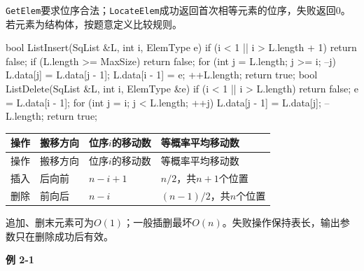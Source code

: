 \texttt{GetElem}要求位序合法；\texttt{LocateElem}成功返回首次相等元素的位序，失败返回0。若元素为结构体，按题意定义比较规则。

\par\smallskip\noindent\begin{minipage}{\linewidth}
\begin{codeblock}[language={C++}]
bool ListInsert(SqList &L, int i, ElemType e) {
    if (i < 1 || i > L.length + 1) return false;
    if (L.length >= MaxSize) return false;
    for (int j = L.length; j >= i; --j)
        L.data[j] = L.data[j - 1];
    L.data[i - 1] = e;
    ++L.length;
    return true;
}
bool ListDelete(SqList &L, int i, ElemType &e) {
    if (i < 1 || i > L.length) return false;
    e = L.data[i - 1];
    for (int j = i; j < L.length; ++j)
        L.data[j - 1] = L.data[j];
    --L.length;
    return true;
}
\end{codeblock}
\end{minipage}\par\smallskip

\par\smallskip
{\fontsize{9.3}{12}\selectfont\setlength{\tabcolsep}{2.5pt}\setlength{\LTleft}{0pt}\setlength{\LTright}{0pt}
\begin{longtable}{@{}>{\raggedright\arraybackslash}p{}>{\raggedright\arraybackslash}p{}>{\raggedright\arraybackslash}p{}>{\raggedright\arraybackslash}p{}@{}}
\toprule
操作 & 搬移方向 & 位序\(i\)的移动数 & 等概率平均移动数 \\

\midrule\endfirsthead\toprule
操作 & 搬移方向 & 位序\(i\)的移动数 & 等概率平均移动数 \\

\midrule\endhead\bottomrule\endfoot
插入 & 后向前 & \(n-i+1\) & \(n/2\)，共\(n+1\)个位置 \\

删除 & 前向后 & \(n-i\) & \((n-1)/2\)，共\(n\)个位置 \\

\end{longtable}}
\par\smallskip

追加、删末元素可为\(O(1)\)；一般插删最坏\(O(n)\)。失败操作保持表长，输出参数只在删除成功后有效。

\par\medskip{}\noindent\hypertarget{DS02-E01}{}\label{DS02-E01}\textbf{例 2-1}\par\nobreak\smallskip

